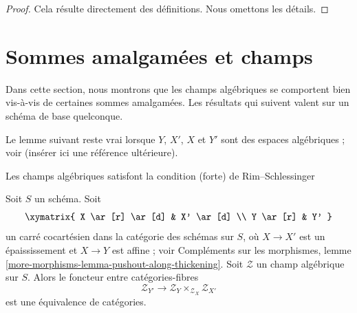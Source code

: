 \begin{proof}
Cela résulte directement des définitions. Nous omettons les détails.
\end{proof}






\section{Sommes amalgamées et champs}
\label{section-pushouts}

\noindent
Dans cette section, nous montrons que les champs algébriques se comportent bien
vis-à-vis de certaines sommes amalgamées. Les résultats qui suivent valent sur
un schéma de base quelconque.

\medskip\noindent
Le lemme suivant reste vrai lorsque $Y$, $X'$, $X$ et $Y'$ sont des espaces
algébriques ; voir (insérer ici une référence ultérieure).

\begin{lemma}
\label{lemma-pushout}
\begin{slogan}
Les champs algébriques satisfont la condition (forte) de Rim--Schlessinger
\end{slogan}
Soit $S$ un schéma. Soit
$$
\xymatrix{
X \ar[r] \ar[d] & X' \ar[d] \\
Y \ar[r] & Y'
}
$$
un carré cocartésien dans la catégorie des schémas sur $S$, où $X \to X'$ est
un épaississement et $X \to Y$ est affine ; voir Compléments sur les
morphismes, lemme \ref{more-morphisms-lemma-pushout-along-thickening}. Soit
$\mathcal{Z}$ un champ algébrique sur $S$. Alors le foncteur entre
catégories-fibres
$$
\mathcal{Z}_{Y'}
\longrightarrow
\mathcal{Z}_Y \times_{\mathcal{Z}_X} \mathcal{Z}_{X'}
$$
est une équivalence de catégories.
\end{lemma}


